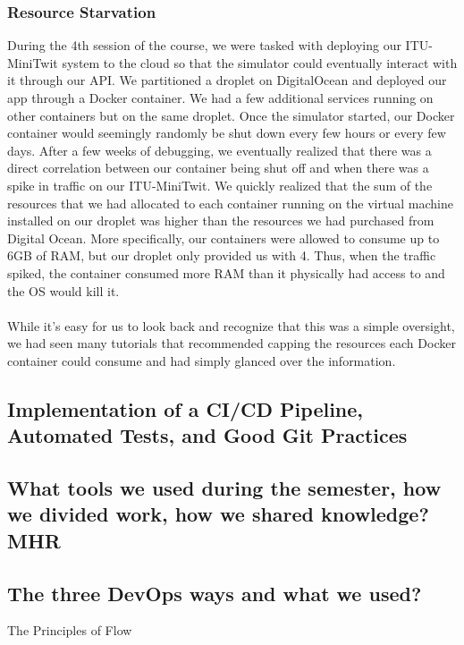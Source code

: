 \documentclass{article}
\begin{document}
\subsubsection{Resource Starvation}
During the 4th session of the course, we were tasked with deploying our ITU-MiniTwit system to the cloud so that the simulator could eventually interact with it through our API. We partitioned a droplet on DigitalOcean and deployed our app through a Docker container. We had a few additional services running on other containers but on the same droplet. Once the simulator started, our Docker container would seemingly randomly be shut down every few hours or every few days. After a few weeks of debugging, we eventually realized that there was a direct correlation between our container being shut off and when there was a spike in traffic on our ITU-MiniTwit. We quickly realized that the sum of the resources that we had allocated to each container running on the virtual machine installed on our droplet was higher than the resources we had purchased from Digital Ocean. More specifically, our containers were allowed to consume up to 6GB of RAM, but our droplet only provided us with 4. Thus, when the traffic spiked, the container consumed more RAM than it physically had access to and the OS would kill it.
\\\\
While it's easy for us to look back and recognize that this was a simple oversight, we had seen many tutorials that recommended capping the resources each Docker container could consume and had simply glanced over the information.

\subsection{Implementation of a CI/CD Pipeline, Automated Tests, and Good Git Practices}


\subsection{What tools we used during the semester, how we divided work, how we shared knowledge? MHR}

\subsection{The three DevOps ways and what we used?}

The Principles of Flow
\end{document}
